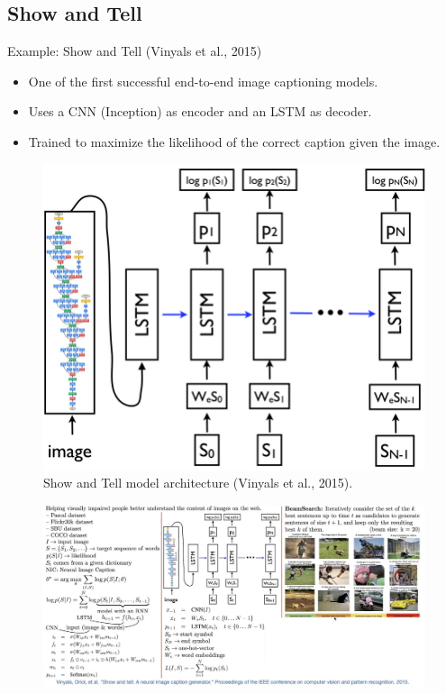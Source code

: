 \subsection{Show and Tell}
\begin{frame}[allowframebreaks]{Example: Show and Tell (Vinyals et al., 2015)}
    \begin{itemize}
        \item One of the first successful end-to-end image captioning models.
        \item Uses a CNN (Inception) as encoder and an LSTM as decoder.
        \item Trained to maximize the likelihood of the correct caption given the image.
    \end{itemize}
    \begin{figure}
        \centering
        \includegraphics[width=\textwidth,height=0.8\textheight,keepaspectratio]{images/vision+text/show-and-tell.png}
        \caption*{Show and Tell model architecture (Vinyals et al., 2015).}
    \end{figure}
\framebreak
    \begin{figure}
        \centering
        \includegraphics[width=1.08\textwidth,height=0.9\textheight,keepaspectratio]{images/vision+text/show-and-tell-2.png}

\end{figure}
\end{frame}
